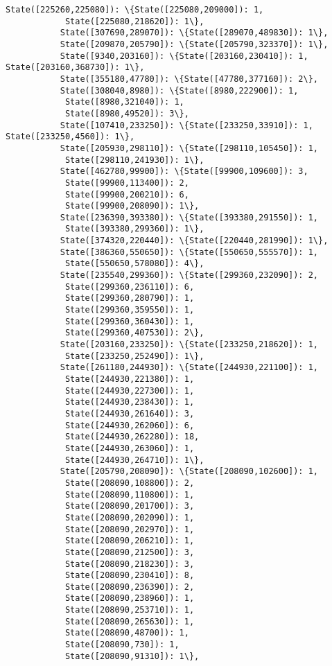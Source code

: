 \documentclass[11pt]{article}
\begin{document}
\begin{Verbatim}[commandchars=\\\{\}]
           State([225260,225080]): \{State([225080,209000]): 1,
            State([225080,218620]): 1\},
           State([307690,289070]): \{State([289070,489830]): 1\},
           State([209870,205790]): \{State([205790,323370]): 1\},
           State([9340,203160]): \{State([203160,230410]): 1, State([203160,368730]): 1\},
           State([355180,47780]): \{State([47780,377160]): 2\},
           State([308040,8980]): \{State([8980,222900]): 1,
            State([8980,321040]): 1,
            State([8980,49520]): 3\},
           State([107410,233250]): \{State([233250,33910]): 1, State([233250,4560]): 1\},
           State([205930,298110]): \{State([298110,105450]): 1,
            State([298110,241930]): 1\},
           State([462780,99900]): \{State([99900,109600]): 3,
            State([99900,113400]): 2,
            State([99900,200210]): 6,
            State([99900,208090]): 1\},
           State([236390,393380]): \{State([393380,291550]): 1,
            State([393380,299360]): 1\},
           State([374320,220440]): \{State([220440,281990]): 1\},
           State([386360,550650]): \{State([550650,555570]): 1,
            State([550650,578080]): 4\},
           State([235540,299360]): \{State([299360,232090]): 2,
            State([299360,236110]): 6,
            State([299360,280790]): 1,
            State([299360,359550]): 1,
            State([299360,360430]): 1,
            State([299360,407530]): 2\},
           State([203160,233250]): \{State([233250,218620]): 1,
            State([233250,252490]): 1\},
           State([261180,244930]): \{State([244930,221100]): 1,
            State([244930,221380]): 1,
            State([244930,227300]): 1,
            State([244930,238430]): 1,
            State([244930,261640]): 3,
            State([244930,262060]): 6,
            State([244930,262280]): 18,
            State([244930,263060]): 1,
            State([244930,264710]): 1\},
           State([205790,208090]): \{State([208090,102600]): 1,
            State([208090,108800]): 2,
            State([208090,110800]): 1,
            State([208090,201700]): 3,
            State([208090,202090]): 1,
            State([208090,202970]): 1,
            State([208090,206210]): 1,
            State([208090,212500]): 3,
            State([208090,218230]): 3,
            State([208090,230410]): 8,
            State([208090,236390]): 2,
            State([208090,238960]): 1,
            State([208090,253710]): 1,
            State([208090,265630]): 1,
            State([208090,48700]): 1,
            State([208090,730]): 1,
            State([208090,91310]): 1\},

\end{Verbatim}
\end{document}
